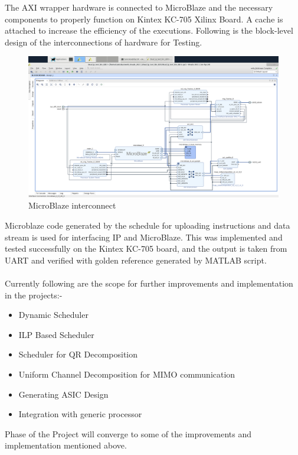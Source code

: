 The AXI wrapper hardware is connected to MicroBlaze and the necessary components to properly function on Kintex KC-705 Xilinx Board. A cache is attached to increase the efficiency of the executions. Following is the block-level design of the interconnections of hardware for Testing.\\



\begin{figure}[H]
    \centering
    \includegraphics[width = \textwidth]{./Software/Schematic_.png}
    \caption{MicroBlaze interconnect}
\end{figure}

\pagebreak
Microblaze code generated by the schedule for uploading instructions and data stream is used for interfacing IP and MicroBlaze. This was implemented and tested successfully on the Kintex KC-705 board, and the output is taken from UART and verified with golden reference generated by MATLAB script.
\\
\\
Currently following are the scope for further improvements and implementation in the projects:-
\begin{itemize}
	\item Dynamic Scheduler
	\item ILP Based Scheduler 
	\item Scheduler for QR Decomposition
	\item Uniform Channel Decomposition for MIMO communication
	\item Generating ASIC Design 
    \item Integration with generic processor
\end{itemize}
Phase  of the Project will converge to some of the improvements and implementation mentioned above.